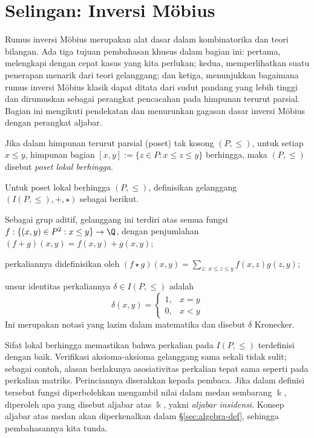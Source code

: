 \section{Selingan: Inversi Möbius}\label{sec:Mobius}
Rumus inversi Möbius merupakan alat dasar dalam kombinatorika dan teori bilangan. Ada tiga tujuan pembahasan khusus dalam bagian ini: pertama, melengkapi dengan cepat kasus yang kita perlukan; kedua, memperlihatkan suatu penerapan menarik dari teori gelanggang; dan ketiga, menunjukkan bagaimana rumus inversi Möbius klasik dapat ditata dari sudut pandang yang lebih tinggi dan dirumuskan sebagai perangkat pencacahan pada himpunan terurut parsial. Bagian ini mengikuti pendekatan \cite[\S\S 3.7--3.8]{Stan09} dan menurunkan gagasan dasar inversi Möbius dengan perangkat aljabar.

\begin{definition}
	Jika dalam himpunan terurut parsial (poset) tak kosong $(P, \leq)$, untuk setiap $x \leq y$, himpunan bagian $[x,y] := \{ z \in P: x \leq z \leq y \}$ berhingga, maka $(P,\leq)$ disebut \emph{poset lokal berhingga}.
\end{definition}

Untuk poset lokal berhingga $(P, \leq)$, definisikan gelanggang $(I(P, \leq),+,\star)$ sebagai berikut.
\begin{compactitem}
	\item Sebagai grup aditif, gelanggang ini terdiri atas semua fungsi $f: \{(x,y) \in P^2 : x \leq y \} \to \Q$, dengan penjumlahan \linebreak $(f+g)(x,y) = f(x,y) + g(x,y)$;
	\item perkaliannya didefinisikan oleh $(f \star g)(x,y) = \sum_{z: \; x \leq z \leq y} f(x,z) g(z,y)$;
	\item unsur identitas perkaliannya $\delta \in I(P, \leq)$ adalah
	\[ \delta(x,y) = \begin{cases} 1, & x=y \\ 0, & x < y \end{cases} \]
	Ini merupakan notasi yang lazim dalam matematika dan disebut $\delta$ Kronecker. 
\end{compactitem}
Sifat lokal berhingga memastikan bahwa perkalian pada $I(P, \leq)$ terdefinisi dengan baik. Verifikasi aksioma-aksioma gelanggang sama sekali tidak sulit; sebagai contoh, alasan berlakunya asosiativitas perkalian tepat sama seperti pada perkalian matriks. Perinciannya diserahkan kepada pembaca. Jika dalam definisi tersebut fungsi diperbolehkan mengambil nilai dalam medan sembarang $\Bbbk$, diperoleh apa yang disebut aljabar atas $\Bbbk$, yakni \emph{aljabar insidensi}. Konsep aljabar atas medan akan diperkenalkan dalam \S\ref{sec:algebra-def}, sehingga pembahasannya kita tunda.

